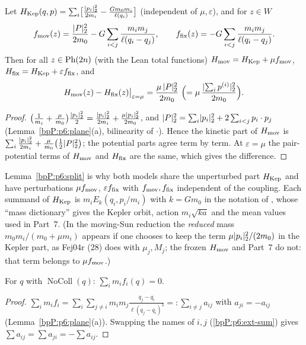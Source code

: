 \begin{lemma}\label{bpP:p6:split}
Let $H_{\rm Kep}(q,p)=\sum_i\bigl[\tfrac{\lvert p_i\rvert_2^2}{2m_i}-\tfrac{Gm_0m_i}{\ell(q_i)}\bigr]$ (independent of $\mu,\varepsilon$), and for $z\in W$
\[f_{\rm mov}(z)=\frac{\lvert P\rvert_2^2}{2m_0}-G\sum_{i<j}\frac{m_im_j}{\ell(q_i-q_j)},\qquad f_{\rm fix}(z)=-G\sum_{i<j}\frac{m_im_j}{\ell(q_i-q_j)}.\]
Then for all $z\in\mathrm{Ph}(2n)$ (with the Lean total functions) $H_{\rm mov}=H_{\rm Kep}+\mu f_{\rm mov}$, $H_{\rm fix}=H_{\rm Kep}+\varepsilon f_{\rm fix}$, and
\[H_{\rm mov}(z)-H_{\rm fix}(z)\big|_{\varepsilon=\mu}=\frac{\mu\,\pl{P}^2}{2m_0}\ \Bigl(=\mu\,\frac{\pl{\sum_ip^{(i)}}^2}{2m_0}\Bigr).\]
\end{lemma}
\begin{proof}
\label{stepP:p6:sp-alg} $\bigl(\tfrac1{m_i}+\tfrac\mu{m_0}\bigr)\tfrac{\lvert p_i\rvert_2^2}2=\tfrac{\lvert p_i\rvert_2^2}{2m_i}+\tfrac{\mu\lvert p_i\rvert_2^2}{2m_0}$, and $\lvert P\rvert_2^2=\sum_i\lvert p_i\rvert_2^2+2\sum_{i<j}p_i\cdot p_j$ (Lemma~\ref{bpP:p6:plane}(a), bilinearity of $\cdot$). Hence the kinetic part of $H_{\rm mov}$ is $\sum_i\frac{\lvert p_i\rvert_2^2}{2m_i}+\frac\mu{m_0}\bigl(\tfrac12\lvert P\rvert_2^2\bigr)$; the potential parts agree term by term. At $\varepsilon=\mu$ the pair-potential terms of $H_{\rm mov}$ and $H_{\rm fix}$ are the same, which gives the difference.
\end{proof}
\begin{remark}\label{bpP:p6:kepler-part}
Lemma~\ref{bpP:p6:split} is why both models share the unperturbed part $H_{\rm Kep}$ and have perturbations $\mu f_{\rm mov}$, $\varepsilon f_{\rm fix}$ with $f_{\rm mov},f_{\rm fix}$ independent of the coupling. Each summand of $H_{\rm Kep}$ is $m_iE_k(q_i,p_i/m_i)$ with $k=Gm_0$ in the notation of , whose ``mass dictionary'' gives the Kepler orbit, action $m_i\sqrt{ka}$ and the mean values used in Part~7. (In the moving-Sun reduction the \emph{reduced} mass $m_0m_i/(m_0+\mu m_i)$ appears if one chooses to keep the term $\mu\lvert p_i\rvert_2^2/(2m_0)$ in the Kepler part, as Fej04r (28) does with $\mu_j,M_j$; the frozen $H_{\rm mov}$ and Part~7 do not: that term belongs to $\mu f_{\rm mov}$.)
\end{remark}

\begin{lemma}\label{bpP:p6:action-reaction}
For $q$ with $\operatorname{NoColl}(q)$: $\sum_im_if_i(q)=0$.
\end{lemma}
\begin{proof}
$\sum_im_if_i=\sum_i\sum_{j\ne i}m_im_j\frac{q_j-q_i}{\ell(q_j-q_i)^3}=:\sum_{i\neq j}a_{ij}$ with $a_{ji}=-a_{ij}$ (Lemma~\ref{bpP:p6:plane}(a)). Swapping the names of $i,j$ (\ref{bpP:p6:ext-sum}) gives $\sum a_{ij}=\sum a_{ji}=-\sum a_{ij}$.
\end{proof}

